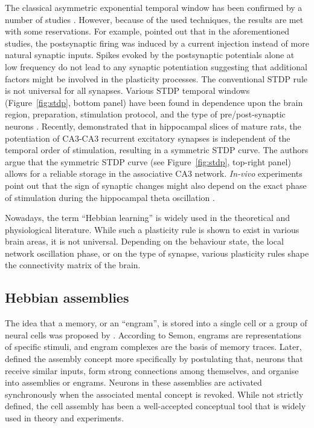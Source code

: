     The classical asymmetric exponential temporal window has been confirmed by
    a number of studies \citep[e.g.,][]{Debanne1998, Zhang1998}. However,
    because of the used techniques, the results are met with some reservations.
    For example, \cite{Lisman2005} pointed out that in the aforementioned
    studies, the postsynaptic firing was induced by a current injection instead
    of more natural synaptic inputs. Spikes evoked by the postsynaptic
    potentials alone at low frequency do not lead to any synaptic potentiation
    \citep{Wittenberg2006} suggesting that additional factors might be involved
    in the plasticity processes. The conventional STDP rule
    \citep[i.e.,][]{Bi1998, Kempter1999} is not universal for all synapses.
    Various STDP temporal windows (Figure~\ref{fig:stdp}, bottom panel) have
    been found in dependence upon the brain region, preparation, stimulation
    protocol, and the type of pre/post-synaptic neurons \citep{Feldman2012,
    Vogels2013}. Recently, \cite{Mishra2016} demonstrated that in hippocampal
    slices of mature rats, the potentiation of CA3-CA3 recurrent excitatory
    synapses is independent of the temporal order of stimulation, resulting in
    a symmetric STDP curve. The authors argue that the symmetric STDP curve
    (see Figure~\ref{fig:stdp}, top-right panel) allows for a reliable storage
    in the associative CA3 network. {\it In-vivo} experiments point out that
    the sign of synaptic changes might also depend on the exact phase of
    stimulation during the hippocampal theta oscillation \citep{Hoelscher1997}.

    Nowadays, the term ``Hebbian learning'' is widely used in the theoretical and
    physiological literature. While such a plasticity rule is shown to exist in
    various brain areas, it is not universal. Depending on the behaviour state,
    the local network oscillation phase, or on the type of synapse, various
    plasticity rules shape the connectivity matrix of the brain.

  \subsection{Hebbian assemblies}
    The idea that a memory, or an ``engram'', is stored into a single cell or a
    group of neural cells was proposed by \cite{Semon1904}. According to Semon,
    engrams are representations of specific stimuli, and engram complexes are
    the basis of memory traces. Later, \cite{Hebb49} defined the assembly
    concept more specifically by postulating that, neurons that receive similar
    inputs, form strong connections among themselves, and organise into assemblies
    or engrams. Neurons in these assemblies are activated synchronously when
    the associated mental concept is revoked. While not strictly defined, the
    cell assembly has been a well-accepted conceptual tool that is widely used
    in theory and experiments.
   
